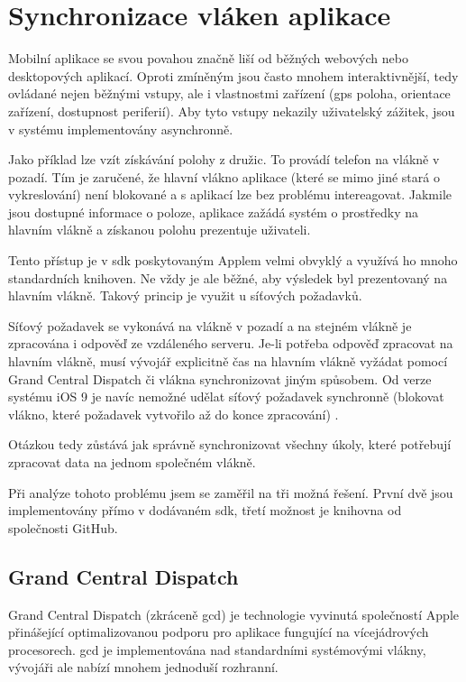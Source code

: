 \section{Synchronizace vláken aplikace} \label{analyza-synchronizace-vlaken}

Mobilní aplikace se svou povahou značně liší od běžných webových nebo desktopových aplikací.
Oproti zmíněným jsou často mnohem interaktivnější, tedy ovládané nejen běžnými vstupy, ale i vlastnostmi zařízení (\acrshort{gps} poloha, orientace zařízení, dostupnost periferií).
Aby tyto vstupy nekazily uživatelský zážitek, jsou v systému implementovány asynchronně.

Jako příklad lze vzít získávání polohy z družic.
To provádí telefon na vlákně v pozadí.
Tím je zaručené, že hlavní vlákno aplikace (které se mimo jiné stará o vykreslování) není blokované a s aplikací lze bez problému intereagovat.
Jakmile jsou dostupné informace o poloze, aplikace zažádá systém o prostředky na hlavním vlákně a získanou polohu prezentuje uživateli.

Tento přístup je v \acrfull{sdk} poskytovaným Applem velmi obvyklý a využívá ho mnoho standardních knihoven.
Ne vždy je ale běžné, aby výsledek byl prezentovaný na hlavním vlákně.
Takový princip je využit u síťových požadavků.

Síťový požadavek se vykonává na vlákně v pozadí a na stejném vlákně je zpracována i odpověď ze vzdáleného serveru.
Je-li potřeba odpověď zpracovat na hlavním vlákně, musí vývojář explicitně čas na hlavním vlákně vyžádat pomocí Grand Central Dispatch či vlákna synchronizovat jiným spůsobem.
Od verze systému iOS 9 je navíc nemožné udělat síťový požadavek synchronně (blokovat vlákno, které požadavek vytvořilo až do konce zpracování) \cite{apple-whats-new-in-ios}.

Otázkou tedy zůstává jak správně synchronizovat všechny úkoly, které potřebují zpracovat data na jednom společném vlákně.

Při analýze tohoto problému jsem se zaměřil na tři možná řešení.
První dvě jsou implementovány přímo v dodávaném \acrshort{sdk}, třetí možnost je knihovna od společnosti GitHub.

\subsection{Grand Central Dispatch}

Grand Central Dispatch (zkráceně \acrshort{gcd}) je technologie vyvinutá společností Apple přinášející optimalizovanou podporu pro aplikace fungující na vícejádrových procesorech.
\acrshort{gcd} je implementována nad standardními systémovými vlákny, vývojáři ale nabízí mnohem jednoduší rozhranní.

